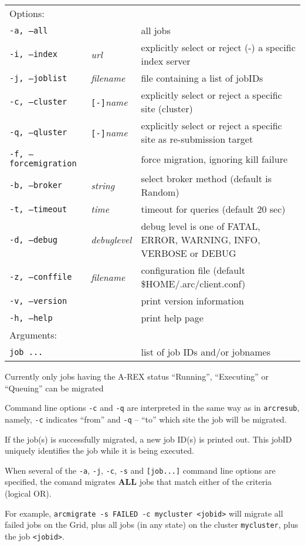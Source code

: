 \hspace*{0.5cm}
\begin{shaded}
\end{shaded}
\begin{longtable}{llp{8cm}}
   Options:&&\\
   \texttt{-a, --all}& & all jobs\\
   \texttt{-i, --index}&\textit{url}&explicitly select or reject (-) a specific index server\\
   \texttt{-j, --joblist}& \textit{filename} & file containing a list of jobIDs\\
   \texttt{-c, --cluster}&\verb#[-]#\textit{name}&explicitly select or reject a specific site (cluster)\\
   \texttt{-q, --qluster}&\verb#[-]#\textit{name}&explicitly select or reject a specific site as re-submission target\\
   \texttt{-f, --forcemigration}& & force migration, ignoring kill failure\\
   \texttt{-b, --broker}&\textit{string}&select broker method (default is Random)\\
   \texttt{-t, --timeout}& \textit{time} & timeout for queries (default 20 sec)\\
   \texttt{-d, --debug}& \textit{debuglevel}&debug level is one of  FATAL, ERROR, WARNING, INFO, VERBOSE or DEBUG\\
   \texttt{-z, --conffile}&\textit{filename}& configuration file (default {\$}HOME/.arc/client.conf)\\
   \texttt{-v, --version}& & print version information\\
   \texttt{-h, --help}& & print help page\\
   Arguments:&&\\
   \texttt{job ...} && list of job IDs and/or jobnames\\
\end{longtable}

\begin{framed}
Currently only jobs having the A-REX status ``Running'', ``Executing'' or ``Queuing'' can be migrated
\end{framed}

Command line options \verb#-c# and \verb #-q# are interpreted in the same way as in \verb#arcresub#, namely,
\verb#-c# indicates ``from'' and \verb #-q# -- ``to'' which site the job will be migrated.

If the job(s) is successfully migrated, a new job ID(s) is printed out. This jobID uniquely
identifies the job while it is being executed.

\begin{framed}
  When several of the \verb#-a#,  \verb#-j#, \verb#-c#, \verb#-s# and \verb#[job...]#
  command line options are specified, the comand migrates \textbf{ALL} jobs that
  match either of the criteria (logical OR).

  For example, \verb#arcmigrate -s FAILED -c mycluster <jobid># will migrate all failed
  jobs on the Grid, plus all jobs (in any state) on the cluster \verb#mycluster#, plus the job \verb#<jobid>#.
\end{framed}
